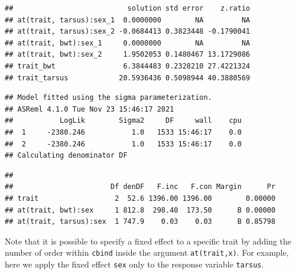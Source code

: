 \documentclass[
  12pt,
]{book}
\begin{document}
\begin{verbatim}
##                           solution std error    z.ratio
## at(trait, tarsus):sex_1  0.0000000        NA         NA
## at(trait, tarsus):sex_2 -0.0684413 0.3823448 -0.1790041
## at(trait, bwt):sex_1     0.0000000        NA         NA
## at(trait, bwt):sex_2     1.9502053 0.1480467 13.1729086
## trait_bwt                6.3844483 0.2328210 27.4221324
## trait_tarsus            20.5936436 0.5098944 40.3880569
\end{verbatim}

\begin{verbatim}
## Model fitted using the sigma parameterization.
## ASReml 4.1.0 Tue Nov 23 15:46:17 2021
##           LogLik        Sigma2     DF     wall    cpu
##  1     -2380.246           1.0   1533 15:46:17    0.0
##  2     -2380.246           1.0   1533 15:46:17    0.0
## Calculating denominator DF
\end{verbatim}

\begin{verbatim}
## 
##                       Df denDF   F.inc   F.con Margin      Pr
## trait                  2  52.6 1396.00 1396.00        0.00000
## at(trait, bwt):sex     1 812.8  298.40  173.50      B 0.00000
## at(trait, tarsus):sex  1 747.9    0.03    0.03      B 0.85798
\end{verbatim}

Note that it is possible to specify a fixed effect to a specific trait by adding the number of order within \texttt{cbind} inside the argument \texttt{at(trait,x)}. For example, here we apply the fixed effect \texttt{sex} only to the response variable \texttt{tarsus}.
\end{document}
